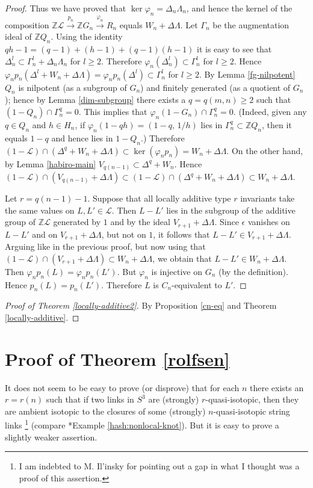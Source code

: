 \documentclass[a4paper,12pt,reqno,oneside]{amsart} %
\theoremstyle{plain}
\theoremstyle{definition}
\theoremstyle{named}
\def\phi{\varphi}
\renewcommand{\:}{\colon}
\def\Z{\mathbb{Z}}
\def\L{\mathcal{L}}
\def\xr#1{\xrightarrow{#1}}
\begin{document}
\begin{proof}
Thus we have proved that $\ker\phi_n=\Delta_n\Lambda_n$, and hence the kernel of the composition $\Z\L\xr{p_n}\Z G_n\xr{\phi_n}R_n$ 
equals $W_n+\Delta\Lambda$.
Let $\Gamma_n$ be the augmentation ideal of $\Z Q_n$.
Using the identity $qh-1=(q-1)+(h-1)+(q-1)(h-1)$ it is easy to see that 
$\Delta_n^l\subset\Gamma_n^l+\Delta_n\Lambda_n$ for $l\ge 2$.
Therefore $\phi_n(\Delta_n^l)\subset\Gamma_n^l$ for $l\ge 2$.
Hence $\phi_n p_n(\Delta^l+W_n+\Delta\Lambda)=\phi_n p_n(\Delta^l)\subset\Gamma_n^l$ for $l\ge 2$.
By Lemma \ref{fg-nilpotent} $Q_n$ is nilpotent (as a subgroup of $G_n$) and finitely generated 
(as a quotient of $G_n$); hence by Lemma \ref{dim-subgroup} there exists a $q=q(m,n)\ge 2$ such that 
$(1-Q_n)\cap\Gamma_n^q=0$.
This implies that $\phi_n(1-G_n)\cap\Gamma_n^q=0$.
(Indeed, given any $q\in Q_n$ and $h\in H_n$, if $\phi_n(1-qh)=(1-q,\,1/h)$ lies in $\Gamma_n^q\subset\Z Q_n$, 
then it equals $1-q$ and hence lies in $1-Q_n$.)
Therefore $(1-\L)\cap (\Delta^q+W_n+\Delta\Lambda)\subset\ker(\phi_n p_n)=W_n+\Delta\Lambda$.
On the other hand, by Lemma \ref{habiro-main} $V_{q(n-1)}\subset\Delta^q+W_n$.
Hence $(1-\L)\cap (V_{q(n-1)}+\Delta\Lambda)\subset(1-\L)\cap(\Delta^q+W_n+\Delta\Lambda)\subset W_n+\Delta\Lambda$.

Let $r=q(n-1)-1$.
Suppose that all locally additive type $r$ invariants take the same values on $L,L'\in\L$.
Then $L-L'$ lies in the subgroup of the additive group of $\Z\L$ generated by $1$ and by the ideal 
$V_{r+1}+\Delta\Lambda$.
Since $\epsilon$ vanishes on $L-L'$ and on $V_{r+1}+\Delta\Lambda$, but not on $1$, it follows that 
$L-L'\in V_{r+1}+\Delta\Lambda$.
Arguing like in the previous proof, but now using that $(1-\L)\cap (V_{r+1}+\Delta\Lambda)\subset W_n+\Delta\Lambda$,
we obtain that $L-L'\in W_n+\Delta\Lambda$.
Then $\phi_n p_n(L)=\phi_n p_n(L')$.
But $\phi_n$ is injective on $G_n$ (by the definition).
Hence $p_n(L)=p_n(L')$.
Therefore $L$ is $C_n$-equivalent to $L'$.
\end{proof}

\begin{proof}[Proof of Theorem \ref{locally-additive2}]
By Proposition \ref{cn-eq} and Theorem \ref{locally-additive}.
\end{proof}


\section{Proof of Theorem \ref{rolfsen}} \label{proof-rolfsen}

It does not seem to be easy to prove (or disprove) that for each $n$ there exists an $r=r(n)$ such that if two links in $S^3$ 
are (strongly) $r$-quasi-isotopic, then they are ambient isotopic to the closures of some (strongly) $n$-quasi-isotopic string links%
\footnote{I am indebted to M. Il'insky for pointing out a gap in what I thought was a proof of this assertion.}
(compare \cite{M24-1'}*{Example \ref{hash:nonlocal-knot}}).
But it is easy to prove a slightly weaker assertion.
\end{document}
